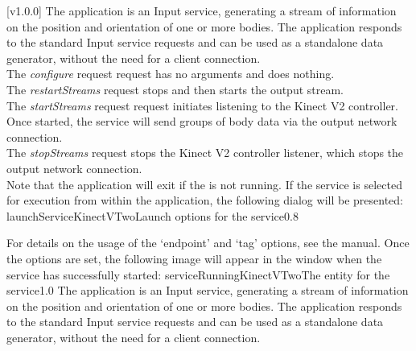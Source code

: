 [v1.0.0]
The  application is an Input service,
generating a stream of information on the position and orientation of one or more bodies.
The application responds to the standard Input service requests and can be used as a
standalone data generator, without the need for a client connection.\\

The \emph{configure} request request has no arguments and does nothing.\\

The \emph{restartStreams} request stops and then starts the output stream.\\

The \emph{startStreams} request request initiates listening to the Kinect V2 controller.
Once started, the service will send groups of body data via the output \yarp{} network
connection.\\

The \emph{stopStreams} request stops the Kinect V2 controller listener, which stops the
output \yarp{} network connection.\\ 

Note that the application will exit if the \emph{\RS} is not running.
\insertAppParameters
\insertTagDescription{\KVtwoI}
\insertInputServiceComment
\condPage
\insertStandardServiceCommands
\secondaryEnd
\condPage
{}
If the service is selected for execution from within the \emph{\MMMU} application, the
following dialog will be presented:
%
{launchServiceKinectVTwo}{Launch options for the \emph{\KVtwoI} service}{0.8}

For details on the usage of the `endpoint' and `tag' options, see the \emph{\MMMU} manual.
Once the options are set, the following image will appear in the \emph{\MMMU} window when
the service has successfully started:
%
{serviceRunningKinectVTwo}{The \emph{\MMMU} entity for the \emph{\KVtwoI} service}{1.0}
\secondaryEnd
\primaryEnd
{}
The  application is an Input service,
generating a stream of information on the position and orientation of one or more bodies.
The application responds to the standard Input service requests and can be used as a
standalone data generator, without the need for a client connection.\\


